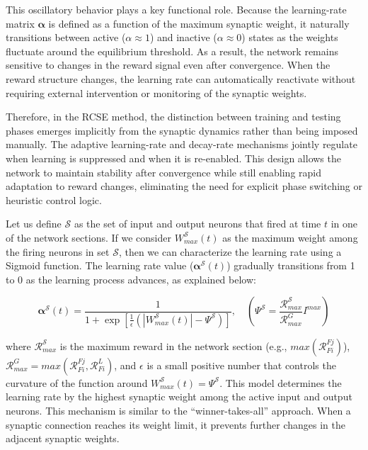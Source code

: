 This oscillatory behavior plays a key functional role. Because the learning-rate matrix $\bm{\alpha}$ is defined as a function of the maximum synaptic weight, it naturally transitions between active ($\alpha \approx 1$) and inactive ($\alpha \approx 0$) states as the weights fluctuate around the equilibrium threshold. As a result, the network remains sensitive to changes in the reward signal even after convergence. When the reward structure changes, the learning rate can automatically reactivate without requiring external intervention or monitoring of the synaptic weights.

Therefore, in the \ac{RCSE} method, the distinction between training and testing phases emerges implicitly from the synaptic dynamics rather than being imposed manually. The adaptive learning-rate and decay-rate mechanisms jointly regulate when learning is suppressed and when it is re-enabled. This design allows the network to maintain stability after convergence while still enabling rapid adaptation to reward changes, eliminating the need for explicit phase switching or heuristic control logic.


Let us define \(\mathcal{S}\) as the set of input and output neurons that fired at time \(t\) in one of the network sections. If we consider \(W_{max}^{\mathcal{S}}(t)\) as the maximum weight among the firing neurons in set \(\mathcal{S}\), then we can characterize the learning rate using a Sigmoid function. The learning rate value (\(\boldsymbol{\alpha}^{\mathcal{S}}(t)\)) gradually transitions from 1 to 0 as the learning process advances, as explained below:

\begin{equation} \label{Eq.WS.1}
    \boldsymbol{\alpha}^{\mathcal{S}}(t) = \frac{1}{1 + \exp{\left[\frac{1}{\epsilon}\left( |W_{max}^{\mathcal{S}}(t)| - \Psi^{\mathcal{S}} \right)\right]}}, \quad \left(\Psi^{\mathcal{S}} = \frac{\mathcal{R}_{max}^{\mathcal{S}}}{\mathcal{R}_{max}^{G}} I^{max} \right)
\end{equation}

\noindent where \(\mathcal{R}_{max}^{\mathcal{S}}\) is the maximum reward in the network section (e.g., \(max(\mathcal{R}_{Fi}^{Fj})\)), \(\mathcal{R}_{max}^{G} = max(\mathcal{R}_{Fi}^{Fj}, \mathcal{R}_{Fi}^{L})\), and \(\epsilon\) is a small positive number that controls the curvature of the function around \(W_{max}^{\mathcal{S}}(t) =  \Psi^{\mathcal{S}}\). This model determines the learning rate by the highest synaptic weight among the active input and output neurons. This mechanism is similar to the ``winner-takes-all'' approach. When a synaptic connection reaches its weight limit, it prevents further changes in the adjacent synaptic weights. 

